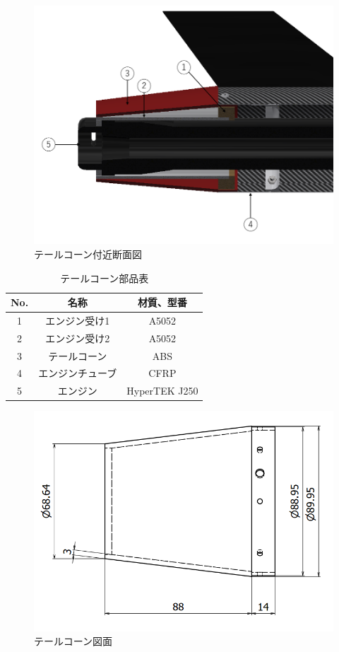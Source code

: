\documentclass[a4paper,11pt,titlepage,uplatex]{jsarticle}
\begin{document}
\begin{figure}[H]
    \centering
    \includegraphics[scale = 0.4]{pic_str/s_talecorn_num.png}
    \caption{テールコーン付近断面図}
    \label{s_tale_num}
\end{figure}

\begin{table}[H]
    \centering
    \caption{テールコーン部品表}
    \begin{tabular}{ccc} \toprule
        No.&名称&材質、型番\\ \midrule
        1&エンジン受け1&A5052\\
        2&エンジン受け2&A5052\\
        3&テールコーン&ABS\\
        4&エンジンチューブ&CFRP\\
        5&エンジン&HyperTEK J250\\ \bottomrule
    \end{tabular}
    \label{s_tale_table}
\end{table}

\begin{figure}[H]
    \centering
    \includegraphics[scale = 0.6]{pic_str/s_talecorn_zumen.png}
    \caption{テールコーン図面}
    \label{s_tale_zumen}
\end{figure}
\end{document}
